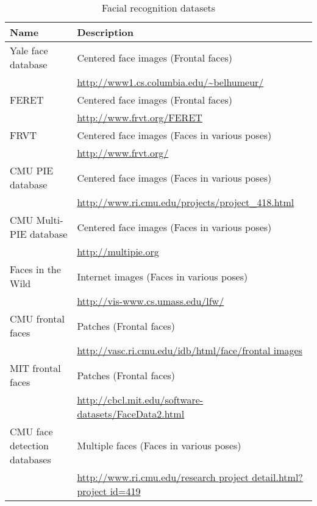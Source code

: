 \documentclass[11pt]{article} %
\theoremstyle{plain}
\theoremstyle{definition}
\theoremstyle{remark}
\numberwithin{equation}{section} %
\numberwithin{figure}{section} %
\numberwithin{table}{section} %
\begin{document}
\begin{table}[H]
  \centering
  \caption{Facial recognition datasets}
  \label{tab:datasets}
  \begin{tabular}{ l p{10cm} }
    Name & Description \\ 
    \hline
    Yale face database & Centered face images (Frontal faces) \\
    & \url{http://www1.cs.columbia.edu/~belhumeur/} \\
    FERET & Centered face images (Frontal faces) \\
    & \url{http://www.frvt.org/FERET} \\
    FRVT & Centered face images (Faces in various poses) \\
    & \url{http://www.frvt.org/} \\
    CMU PIE database & Centered face images (Faces in various poses) \\
    & \url{http://www.ri.cmu.edu/projects/project_418.html} \\
    CMU Multi-PIE database & Centered face images (Faces in various poses) \\
    & \url{http://multipie.org} \\
    Faces in the Wild & Internet images (Faces in various poses) \\
    & \url{http://vis-www.cs.umass.edu/lfw/} \\
    CMU frontal faces & Patches (Frontal faces) \\
    & \url{http://vasc.ri.cmu.edu/idb/html/face/frontal images} \\
    MIT frontal faces & Patches (Frontal faces) \\
    & \url{http://cbcl.mit.edu/software-datasets/FaceData2.html} \\
    CMU face detection databases & Multiple faces (Faces in various poses) \\
    & \url{http://www.ri.cmu.edu/research project detail.html?project id=419}
  \end{tabular}
\end{table}



\end{document}
